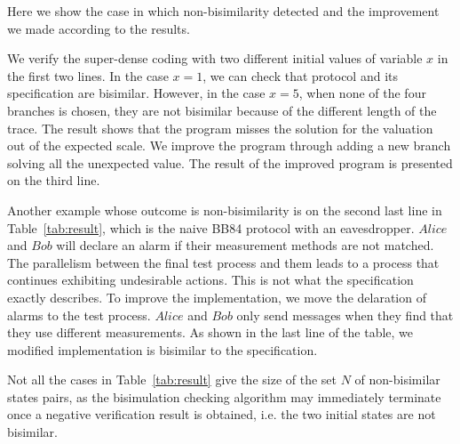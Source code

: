 \documentclass[a4paper,UKenglish,cleveref, autoref]{lipics-v2019}
\begin{document}

Here we show the case in which non-bisimilarity detected and the improvement we made according to the results.

We verify the super-dense coding with two different initial values of variable $x$ in the first two lines. In the case $x=1$, we can check that protocol and its specification are bisimilar. However, in the case $x=5$, when none of the four branches is chosen, they are not bisimilar because of the different length of the trace. The result shows that the program misses the solution for the valuation out of the expected scale. We improve the program through adding a new branch solving all the unexpected value. The result of the improved program is presented on the third line. 


Another example whose outcome is non-bisimilarity is on the second last line in Table~\ref{tab:result}, which is the naive BB84 protocol with an eavesdropper. $Alice$ and $Bob$ will declare an alarm if their measurement methods are not matched. The parallelism between the final test process and them leads to a process that continues exhibiting undesirable actions. This is not what the specification exactly describes. To improve the implementation, we move the delaration of alarms to the test process. $Alice$ and $Bob$ only send messages when they find that they use different measurements. As shown in the last line of the table, we modified implementation is bisimilar to the specification.

Not all the cases in Table~\ref{tab:result} give the size of the set $N$ of non-bisimilar states pairs, as the bisimulation checking algorithm may immediately terminate once a negative verification result is obtained, i.e. the two initial states are not bisimilar. 
\end{document}
